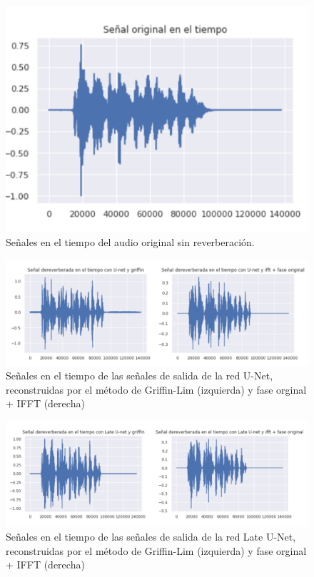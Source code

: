 \begin{figure}
    \centering
    \includegraphics[scale=0.5]{img/Time_OG.png}
    \caption{Señales en el tiempo del audio original sin reverberación.}
    \label{fig:Time_OG}
\end{figure}

\begin{figure}
    \centering
    \includegraphics[scale=0.5]{img/Comp_Time_Unet.PNG}
    \caption{Señales en el tiempo de las señales de salida de la red U-Net, reconstruidas por el método de Griffin-Lim (izquierda) y fase orginal + IFFT (derecha)}
    \label{fig:Time_UNet_comp}
\end{figure}
\begin{figure}
    \centering
    \includegraphics[scale=0.5]{img/Comp_Time_LateUnet.PNG}
    \caption{Señales en el tiempo de las señales de salida de la red Late U-Net, reconstruidas por el método de Griffin-Lim (izquierda) y fase orginal + IFFT (derecha)}
    \label{fig:Time_LateUNet_comp}
\end{figure}

